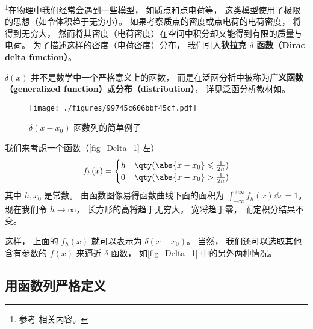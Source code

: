 
\footnote{参考 \cite{Arfken} 相关内容。}在物理中我们经常会遇到一些模型， 如质点和点电荷等， 这类模型使用了极限的思想（如令体积趋于无穷小）。 如果考察质点的密度或点电荷的电荷密度， 将得到无穷大， 然而将其密度（电荷密度）在空间中积分却又能得到有限的质量与电荷。 为了描述这样的密度（电荷密度）分布， 我们引入\textbf{狄拉克 $\delta$ 函数（Dirac delta function）}。

$\delta(x)$ 并不是数学中一个严格意义上的函数， 而是在泛函分析中被称为\textbf{广义函数（generalized function）}或\textbf{分布（distribution）}， 详见泛函分析教材如\cite{Zeidler}。

\begin{figure}[ht]
\centering
\texttt{[image: ./figures/99745c606bbf45cf.pdf]}
\caption{$\delta(x - x_0)$ 函数列的简单例子} \label{fig_Delta_1}
\end{figure}

我们来考虑一个函数（\autoref{fig_Delta_1} 左）
\begin{equation}\label{eq_Delta_6}
f_h(x) =
\begin{cases}
h & \qty( \abs{x - x_0} \leqslant \frac{1}{2h} )\\
0 & \qty( \abs{x - x_0} > \frac{1}{2h} )
\end{cases}
\end{equation}
其中 $h, x_0$ 是常数。 由函数图像易得函数曲线下面的面积为 $\int_{-\infty}^{+\infty} f_h(x) \dd{x} = 1$。 现在我们令 $h \to \infty$， 长方形的高将趋于无穷大， 宽将趋于零， 而定积分结果不变。

这样， 上面的 $f_h(x)$ 就可以表示为 $\delta(x - x_0)$。 当然， 我们还可以选取其他含有参数的 $f(x)$ 来逼近 $\delta$ 函数， 如\autoref{fig_Delta_1} 中的另外两种情况。

\subsection{用函数列严格定义}

